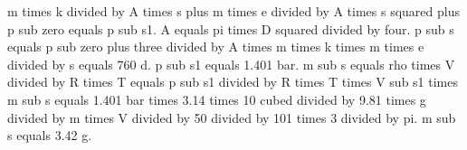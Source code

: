 m times k divided by A times s plus m times e divided by A times s squared plus p sub zero equals p sub s1.  
A equals pi times D squared divided by four.  
p sub s equals p sub zero plus three divided by A times m times k times m times e divided by s equals 760 d.  
p sub s1 equals 1.401 bar.  
m sub s equals rho times V divided by R times T equals p sub s1 divided by R times T times V sub s1 times m sub s equals 1.401 bar times 3.14 times 10 cubed divided by 9.81 times g divided by m times V divided by 50 divided by 101 times 3 divided by pi.  
m sub s equals 3.42 g.